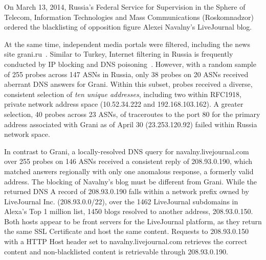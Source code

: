 On March 13, 2014, Russia's Federal Service for Supervision in the Sphere of Telecom, Information Technologies and Mass Communications (Roskomnadzor) ordered the blacklisting of opposition figure Alexei Navalny's LiveJournal blog.

At the same time, independent media portals were filtered, including the news site
grani.ru~\cite{ibtimes2014russia}.  Similar to Turkey, Internet filtering in
Russia is frequently conducted by IP blocking and DNS
poisoning~\cite{rugovdns,verkamp2012inferring}.  However, with a random sample
of 255 probes across 147 ASNs in Russia, only 38 probes on 20 ASNs received
aberrant DNS answers for Grani. Within this subset, probes received a diverse, consistent
selection of \emph{ten unique addresses}, including two within RFC1918, private
network address space (10.52.34.222 and 192.168.103.162). A greater selection,
40 probes across 23 ASNs, of traceroutes to the port 80 for the primary address
associated with Grani as of April 30 (23.253.120.92) failed within Russia
network space. 

In contrast to Grani, a locally-resolved DNS query for navalny.livejournal.com
over 255 probes on 146 ASNs received a consistent reply of 208.93.0.190, which
matched answers regionally with only one anomalous response, a formerly valid
address. The blocking of Navalny's blog must be different from Grani. While the
returned DNS A record of 208.93.0.190 falls within a network prefix owned by
LiveJournal Inc. (208.93.0.0/22), over the 1462 LiveJournal subdomains in
Alexa's Top 1 million list, 1450 blogs resolved to another address, 208.93.0.150.
Both hosts appear to be front servers for the LiveJournal platform, as they return
the same SSL Certificate and host the same content. Requests to 208.93.0.150
with a HTTP Host header set to navalny.livejournal.com retrieves the correct
content and non-blacklisted content is retrievable through 208.93.0.190.

